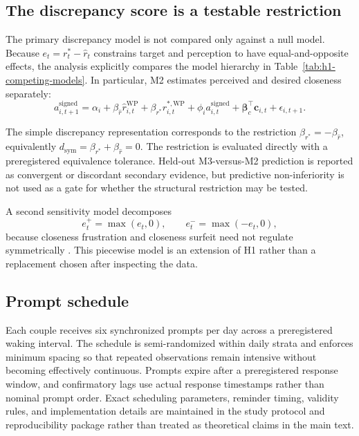 \subsection{The discrepancy score is a testable restriction}

The primary discrepancy model is not compared only against a null model. Because \(e_t=r^\ast_t-\hat r_t\) constrains target and perception to have equal-and-opposite effects, the analysis explicitly compares the model hierarchy in Table~\ref{tab:h1-competing-models}. In particular, M2 estimates perceived and desired closeness separately:
\begin{equation}
a^{\mathrm{signed}}_{i,t+1}
=
\alpha_i
+
\beta_{\hat r}\hat r^{\mathrm{WP}}_{i,t}
+
\beta_{r^\ast}r^{\ast,\mathrm{WP}}_{i,t}
+
\phi_i a^{\mathrm{signed}}_{i,t}
+
\boldsymbol{\beta}_c^\top\mathbf c_{i,t}
+
\epsilon_{i,t+1}.
\label{eq:h1-components}
\end{equation}

The simple discrepancy representation corresponds to the restriction \(\beta_{r^\ast}=-\beta_{\hat r}\), equivalently \(d_{\mathrm{sym}}=\beta_{r^\ast}+\beta_{\hat r}=0\). The restriction is evaluated directly with a preregistered equivalence tolerance. Held-out M3-versus-M2 prediction is reported as convergent or discordant secondary evidence, but predictive non-inferiority is not used as a gate for whether the structural restriction may be tested.

A second sensitivity model decomposes
\[
e^+_t=\max(e_t,0),
\qquad
e^-_t=\max(-e_t,0),
\]
because closeness frustration and closeness surfeit need not regulate symmetrically \parencite{pusch2022closeness,pietras2024closeness}. This piecewise model is an extension of H1 rather than a replacement chosen after inspecting the data.

\subsection{Prompt schedule}

Each couple receives six synchronized prompts per day across a preregistered waking interval. The schedule is semi-randomized within daily strata and enforces minimum spacing so that repeated observations remain intensive without becoming effectively continuous. Prompts expire after a preregistered response window, and confirmatory lags use actual response timestamps rather than nominal prompt order. Exact scheduling parameters, reminder timing, validity rules, and implementation details are maintained in the study protocol and reproducibility package rather than treated as theoretical claims in the main text.

